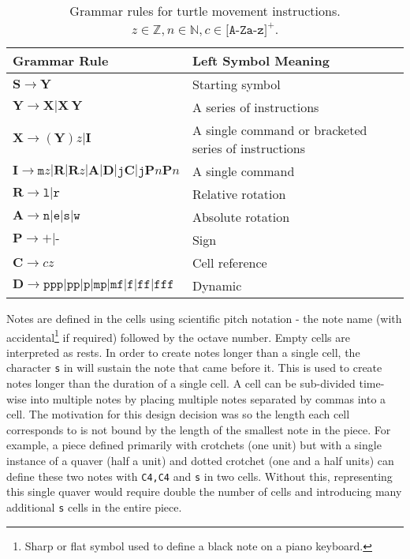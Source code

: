 \documentclass{article}
\begin{document}
\begin{table}
\centering
\caption{Grammar rules for turtle movement instructions. $z \in \mathbb{Z}, n \in \mathbb{N}, c \in \texttt{[A-Za-z]}^{+}$.}
\begin{tabular}{|l|l|} \hline
\textbf{Grammar Rule}&\textbf{Left Symbol Meaning}\\ \hline
\( \mathbf{S} \rightarrow \mathbf{Y} \)& Starting symbol\\ \hline
\( \mathbf{Y} \rightarrow \mathbf{X} | \mathbf{X} \ \mathbf{Y} \)& A series of instructions\\ \hline
\( \mathbf{X} \rightarrow (\mathbf{Y})z|\mathbf{I} \)& A single command or bracketed series of instructions\\ \hline
\( \mathbf{I} \rightarrow \texttt{m}z|\mathbf{R}|\mathbf{R}z|\mathbf{A}|\mathbf{D}|\texttt{j}\mathbf{C}|\texttt{j}\mathbf{P}n\mathbf{P}n \)& A single command\\ \hline
\( \mathbf{R} \rightarrow \texttt{l}|\texttt{r} \)& Relative rotation\\ \hline
\( \mathbf{A} \rightarrow \texttt{n}|\texttt{e}|\texttt{s}|\texttt{w} \)& Absolute rotation\\ \hline
\( \mathbf{P} \rightarrow \texttt{+}|\texttt{-} \)& Sign\\ \hline
\( \mathbf{C} \rightarrow cz \)& Cell reference\\ \hline
\( \mathbf{D} \rightarrow \texttt{ppp}|\texttt{pp}|\texttt{p}|\texttt{mp}|\texttt{mf}|\texttt{f}|\texttt{ff}|\texttt{fff} \)& Dynamic\\
\hline\end{tabular}
\label{tab:grammar}
\end{table}

Notes are defined in the cells using scientific pitch notation - the note name (with accidental\footnote{Sharp or flat symbol used to define a black note on a piano keyboard.} if required) followed by the octave number. Empty cells are interpreted as rests. In order to create notes longer than a single cell, the character \texttt{s} in will sustain the note that came before it. This is used to create notes longer than the duration of a single cell. A cell can be sub-divided time-wise into multiple notes by placing multiple notes separated by commas into a cell. The motivation for this design decision was so the length each cell corresponds to is not bound by the length of the smallest note in the piece. For example, a piece defined primarily with crotchets (one unit) but with a single instance of a quaver (half a unit) and dotted crotchet (one and a half units) can define these two notes with \texttt{C4,C4} and \texttt{s} in two cells. Without this, representing this single quaver would require double the number of cells and introducing many additional \texttt{s} cells in the entire piece.
\end{document}
